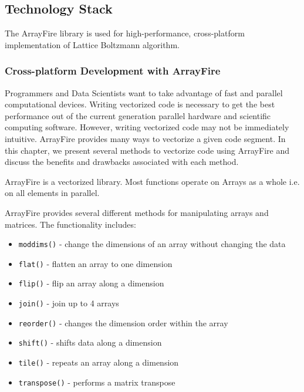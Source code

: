 \subsection{Technology Stack} \label{sec:tech-stack}


The ArrayFire library is used for high-performance, cross-platform implementation of Lattice Boltzmann algorithm.

\subsubsection{Cross-platform Development with ArrayFire}

Programmers and Data Scientists want to take advantage of fast and parallel computational devices. Writing vectorized code is necessary to get the best performance out of the current generation parallel hardware and scientific computing software. However, writing vectorized code may not be immediately intuitive. ArrayFire provides many ways to vectorize a given code segment. In this chapter, we present several methods to vectorize code using ArrayFire and discuss the benefits and drawbacks associated with each method.

ArrayFire is a vectorized library. Most functions operate on Arrays as a whole i.e. on all elements in parallel.

ArrayFire provides several different methods for manipulating arrays and matrices. The functionality includes:

\begin{itemize}
\item \texttt{moddims()} - change the dimensions of an array without changing the data
\item \texttt{flat()}  - flatten an array to one dimension
\item \texttt{flip()}  - flip an array along a dimension
\item \texttt{join()}  - join up to 4 arrays
\item \texttt{reorder()}  - changes the dimension order within the array
\item \texttt{shift()}  - shifts data along a dimension
\item \texttt{tile()}  - repeats an array along a dimension
\item \texttt{transpose()}  - performs a matrix transpose
\end{itemize}

